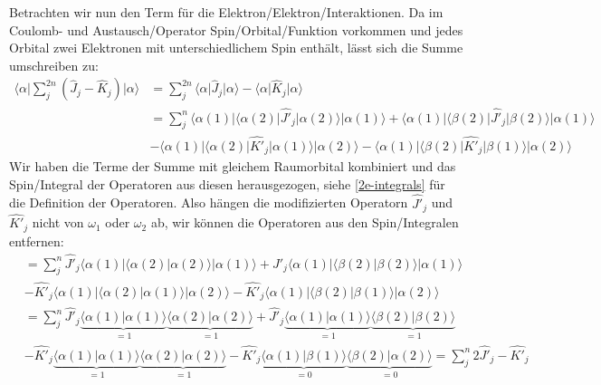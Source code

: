 Betrachten wir nun den Term für die Elektron\-/Elektron\-/Interaktionen.
Da im Coulomb- und Austausch\-/Operator Spin\-/Orbital\-/Funktion vorkommen und
jedes Orbital zwei Elektronen mit unterschiedlichem Spin enthält, lässt sich die Summe umschreiben zu:
\begin{align*}
  \langle \alpha \vert \sum_j^{2n} \left( \hat{J}_j - \hat{K}_j \right) \vert \alpha \rangle
  &= \sum_j^{2n} \langle \alpha \vert \hat{J}_j \vert \alpha \rangle
  - \langle \alpha \vert \hat{K}_j \vert \alpha \rangle \\
  &= \sum_j^{n} 
  \langle \alpha(1) \vert \langle \alpha(2) \vert \hat{J'}_j \vert \alpha(2) \rangle \vert \alpha(1) \rangle
  + \langle \alpha(1) \vert \langle \beta(2) \vert \hat{J'}_j \vert \beta(2) \rangle \vert \alpha(1) \rangle\\
  &- \langle \alpha(1) \vert \langle \alpha(2) \vert \hat{K'}_j \vert \alpha(1) \rangle \vert \alpha(2) \rangle
  - \langle \alpha(1) \vert \langle \beta(2) \vert \hat{K'}_j \vert \beta(1) \rangle \vert \alpha(2) \rangle
\end{align*}
Wir haben die Terme der Summe mit gleichem Raumorbital kombiniert und
das Spin\-/Integral der Operatoren aus diesen herausgezogen,
siehe \cref{2e-integrals} für die Definition der Operatoren.
Also hängen die modifizierten Operatorn $\hat{J'}_j$ und $\hat{K'}_j$ nicht von $\omega_1$ oder $\omega_2$ ab,
wir können die Operatoren aus den Spin\-/Integralen entfernen:
\begin{align*}
  &=\sum_j^{n} 
  \hat{J'}_j \langle \alpha(1) \vert \langle \alpha(2) \vert \alpha(2) \rangle \vert \alpha(1) \rangle
  + \hat{J'}_j \langle \alpha(1) \vert \langle \beta(2) \vert \beta(2) \rangle \vert \alpha(1) \rangle\\
  &- \hat{K'}_j \langle \alpha(1) \vert \langle \alpha(2) \vert \alpha(1) \rangle \vert \alpha(2) \rangle
  - \hat{K'}_j \langle \alpha(1) \vert \langle \beta(2) \vert \beta(1) \rangle \vert \alpha(2) \rangle\\
  &=\sum_j^{n} 
  \hat{J'}_j \underbrace{\langle \alpha(1) \vert \alpha(1) \rangle}_{=1}
  \underbrace{\langle \alpha(2) \vert \alpha(2) \rangle}_{=1}
  + \hat{J'}_j \underbrace{\langle \alpha(1) \vert \alpha(1) \rangle}_{=1}
  \underbrace{\langle \beta(2) \vert \beta(2) \rangle}_{=1}\\
  &- \hat{K'}_j \underbrace{\langle \alpha(1) \vert \alpha(1) \rangle}_{=1}
  \underbrace{\langle \alpha(2) \vert \alpha(2) \rangle}_{=1}
  - \hat{K'}_j \underbrace{\langle \alpha(1) \vert \beta(1) \rangle}_{=0}
  \underbrace{\langle \beta(2) \vert \alpha(2) \rangle}_{=0}
  =\sum_j^{n} 2\hat{J'}_j - \hat{K'}_j
\end{align*}

